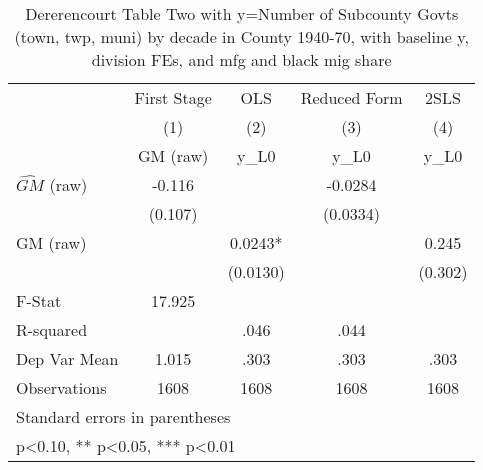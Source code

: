 \begin{table}[htbp]\centering
\def\sym#1{\ifmmode^{#1}\else\(^{#1}\)\fi}
\caption{Dererencourt Table Two with y=Number of Subcounty Govts (town, twp, muni) by decade in County 1940-70, with baseline y, division FEs, and mfg and black mig share}
\begin{tabular}{l*{4}{c}}
\toprule
                    & First Stage   &         OLS   &Reduced Form   &        2SLS   \\
                    &\multicolumn{1}{c}{(1)}&\multicolumn{1}{c}{(2)}&\multicolumn{1}{c}{(3)}&\multicolumn{1}{c}{(4)}\\
                    &\multicolumn{1}{c}{GM  (raw)}&\multicolumn{1}{c}{y\_L0}&\multicolumn{1}{c}{y\_L0}&\multicolumn{1}{c}{y\_L0}\\
\midrule
$\hat{GM}$ (raw)    &      -0.116   &               &     -0.0284   &               \\
                    &     (0.107)   &               &    (0.0334)   &               \\
\addlinespace
GM  (raw)           &               &      0.0243*  &               &       0.245   \\
                    &               &    (0.0130)   &               &     (0.302)   \\
\midrule
F-Stat              &      17.925   &               &               &               \\
R-squared           &               &        .046   &        .044   &               \\
Dep Var Mean        &       1.015   &        .303   &        .303   &        .303   \\
Observations        &        1608   &        1608   &        1608   &        1608   \\
\bottomrule
\multicolumn{5}{l}{\footnotesize Standard errors in parentheses}\\
\multicolumn{5}{l}{\footnotesize * p<0.10, ** p<0.05, *** p<0.01}\\
\end{tabular}
\end{table}
